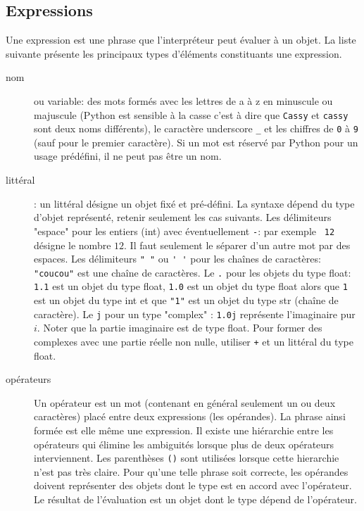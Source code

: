 \subsection{Expressions}
Une expression est une phrase que l'interpréteur peut évaluer à un objet. La liste suivante présente les principaux types d'éléments constituants une expression.
\begin{description}
 \item[nom] ou variable: des mots formés avec les lettres de a à z en minuscule ou majuscule (Python est sensible à la casse c'est à dire que \verb|Cassy| et \verb|cassy| sont deux noms différents), le caractère underscore \verb|_| et les chiffres de \verb|0| à \verb|9| (sauf pour le premier caractère). Si un mot est réservé par Python pour un usage prédéfini, il ne peut pas être un nom.
 \item[littéral] : un littéral désigne un objet fixé et pré-défini. La syntaxe dépend du type d'objet représenté, retenir seulement les cas suivants.\newline
Les délimiteurs "espace" pour les entiers (int) avec éventuellement \verb|-|: par exemple \verb| 12 | désigne le nombre $12$. Il faut seulement le séparer d'un autre mot par des espaces.\newline
Les délimiteurs \verb|" "| ou \verb|' '| pour les chaînes de caractères: \verb|"coucou"| est une chaîne de caractères.\newline
Le \verb|.| pour les objets du type float: \verb|1.1| est un objet du type float, \verb|1.0| est un objet du type float alors que \verb|1| est un objet du type int et que \verb|"1"| est un objet du type str (chaîne de caractère).\newline
Le \verb|j| pour un type "complex" : \verb|1.0j| représente l'imaginaire pur $i$. Noter que la partie imaginaire est de type float. Pour former des complexes avec une partie réelle non nulle, utiliser \verb|+| et un littéral du type float.

\item[opérateurs] Un opérateur est un mot (contenant en général seulement un ou deux caractères) placé entre deux expressions (les opérandes). La phrase ainsi formée est elle même une expression. Il existe une hiérarchie entre les opérateurs qui élimine les ambiguités lorsque plus de deux opérateurs interviennent. Les parenthèses \verb|()| sont utilisées lorsque cette hierarchie n'est pas très claire. Pour qu'une telle phrase soit correcte, les opérandes doivent représenter des objets dont le type est en accord avec l'opérateur. Le résultat de l'évaluation est un objet dont le type dépend de l'opérateur.  
\end{description}

